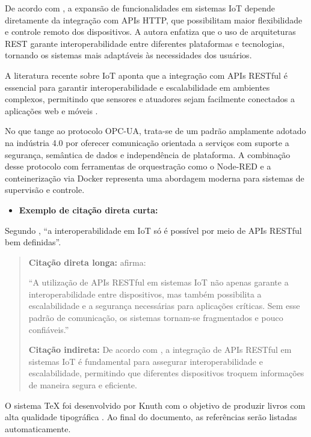 \documentclass[12pt]{unisenaiclass}
\begin{document}
De acordo com \textcite{rodrigues2024}, a expansão de funcionalidades em sistemas IoT
depende diretamente da integração com APIs HTTP, que possibilitam maior flexibilidade e
controle remoto dos dispositivos. A autora enfatiza que o uso de arquiteturas REST garante
interoperabilidade entre diferentes plataformas e tecnologias, tornando os sistemas mais
adaptáveis às necessidades dos usuários.

A literatura recente sobre IoT aponta que a integração com APIs RESTful é essencial para
garantir interoperabilidade e escalabilidade em ambientes complexos, permitindo que sensores
e atuadores sejam facilmente conectados a aplicações web e móveis \cite{aguiar2023,
rodrigues2024}.

No que tange ao protocolo OPC-UA, trata-se de um padrão amplamente adotado na indústria
4.0 por oferecer comunicação orientada a serviços com suporte a segurança, semântica de
dados e independência de plataforma. A combinação desse protocolo com ferramentas de
orquestração como o Node-RED e a conteinerização via Docker representa uma abordagem
moderna para sistemas de supervisão e controle.

\begin{itemize}
    \item \textbf{Exemplo de citação direta curta:}
\end{itemize}

Segundo \textcite{rodrigues2024}, \enquote{a interoperabilidade em IoT só é possível por
meio de APIs RESTful bem definidas}.

\begin{quote}
\textbf{Citação direta longa:} \textcite{rodrigues2024} afirma:

\enquote{A utilização de APIs RESTful em sistemas IoT não apenas garante a
interoperabilidade entre dispositivos, mas também possibilita a escalabilidade e a
segurança necessárias para aplicações críticas. Sem esse padrão de comunicação, os sistemas
tornam-se fragmentados e pouco confiáveis.}

\textbf{Citação indireta:} De acordo com \textcite{rodrigues2024}, a integração de APIs
RESTful em sistemas IoT é fundamental para assegurar interoperabilidade e escalabilidade,
permitindo que diferentes dispositivos troquem informações de maneira segura e eficiente.
\end{quote}

O sistema TeX foi desenvolvido por Knuth com o objetivo de produzir livros com alta
qualidade tipográfica \cite{knuth1984tex}. Ao final do documento, as referências serão
listadas automaticamente.
\end{document}
